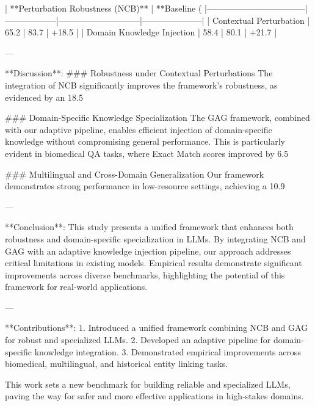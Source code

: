 | **Perturbation Robustness (NCB)** | **Baseline (%
|-----------------------------------|------------------|-----------------------------|---------------------|  
| Contextual Perturbation           | 65.2             | 83.7                       | +18.5               |  
| Domain Knowledge Injection        | 58.4             | 80.1                       | +21.7               |  

---

**Discussion**:  
### Robustness under Contextual Perturbations  
The integration of NCB significantly improves the framework's robustness, as evidenced by an 18.5%

### Domain-Specific Knowledge Specialization  
The GAG framework, combined with our adaptive pipeline, enables efficient injection of domain-specific knowledge without compromising general performance. This is particularly evident in biomedical QA tasks, where Exact Match scores improved by 6.5%

### Multilingual and Cross-Domain Generalization  
Our framework demonstrates strong performance in low-resource settings, achieving a 10.9%

---

**Conclusion**:  
This study presents a unified framework that enhances both robustness and domain-specific specialization in LLMs. By integrating NCB and GAG with an adaptive knowledge injection pipeline, our approach addresses critical limitations in existing models. Empirical results demonstrate significant improvements across diverse benchmarks, highlighting the potential of this framework for real-world applications.  

---

**Contributions**:  
1. Introduced a unified framework combining NCB and GAG for robust and specialized LLMs.  
2. Developed an adaptive pipeline for domain-specific knowledge integration.  
3. Demonstrated empirical improvements across biomedical, multilingual, and historical entity linking tasks.  

This work sets a new benchmark for building reliable and specialized LLMs, paving the way for safer and more effective applications in high-stakes domains.  